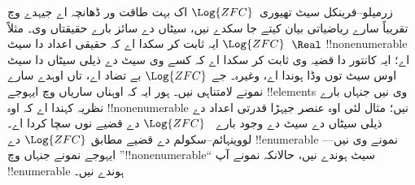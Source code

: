 \documentclass[../../../include/open-logic-section]{subfiles}
\begin{document}
\begin{ex}
زرمیلو--فرینکل سیٹ تھیوری~$\Log{ZFC}$
اک بہت طاقت ور ڈھانچہ اے جیہدے وچ
تقریباً سارے ریاضیاتی بیان کیتے جا سکدے
نیں، سیٹاں دے سائز بارے حقیقتاں وی۔
مثلاً $\Log{ZFC}$ ایہ ثابت کر سکدا اے
کہ حقیقی اعداد دا سیٹ~$\Real$
!!{nonenumerable} اے؛ ایہ کانتور دا
قضیہ وی ثابت کر سکدا اے کہ کسے وی
سیٹ دے ذیلی سیٹاں دا سیٹ اوس سیٹ
توں وڈا ہوندا اے، وغیرہ۔ جے
$\Log{ZFC}$ بے تضاد اے، تاں اوہدے
سارے نمونے لامتناہی نیں۔ ہور ایہ کہ
اوہناں ساریاں وچ ایہوجے !!{element}s
وی نیں جنہاں بارے نظریہ کہندا اے کہ
اوہ !!{nonenumerable} نیں؛ مثال لئی
اوہ عنصر جیہڑا قدرتی اعداد دے ذیلی
سیٹاں دے سیٹ دے وجود بارے
~$\Log{ZFC}$ دے قضیے نوں سچا کردا
اے۔ لووینہائم--سکولم دے قضیے مطابق
$\Log{ZFC}$ دے !!{enumerable}
نمونے وی نیں---ایہوجے نمونے جنہاں
وچ ”!!{nonenumerable}“ سیٹ ہوندے
نیں، حالانکہ نمونے آپ !!{enumerable}
ہوندے نیں۔
\end{ex}
\end{document}
